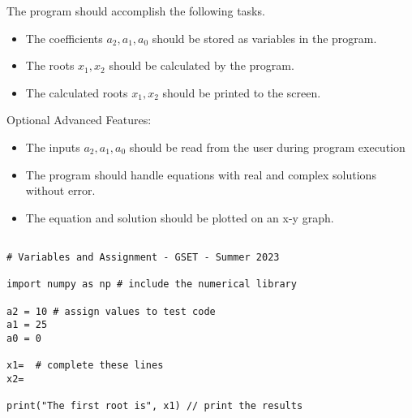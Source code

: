 \documentclass[12pt]{article}
\begin{document}
\begin{description}[labelindent=1cm]
\item[\textbf{\underline{Program Minimum Requirements:}}] \hfill \vspace{0mm}

The program should accomplish the following tasks. 


\begin{itemize}

	\item The coefficients $a_2,a_1,a_0$ should be stored as variables in the program.
	
	\item The roots $x_1, x_2$ should be calculated by the program.
	
	\item The calculated roots $x_1, x_2$ should be printed to the screen.

\end{itemize}	 
	Optional Advanced Features:
\begin{itemize}
	\item The inputs $a_2,a_1,a_0$ should be read from the user during program execution
		
	\item The program should handle equations with real and complex solutions without error. 
    
    \item The equation and solution should be plotted on an x-y graph.
    
\end{itemize}	
\newpage

\item[\textbf{\underline{Example Code:}}] \hfill \vspace{0mm}

	\begin{lstlisting}

# Variables and Assignment - GSET - Summer 2023 
	
import numpy as np # include the numerical library

a2 = 10 # assign values to test code
a1 = 25  
a0 = 0   

x1=  # complete these lines
x2=  

print("The first root is", x1) // print the results
	
	\end{lstlisting}
		


	\item[\textbf{\underline{Part 3 - Testing:}}] \hfill \vspace{0mm}
	\begin{enumerate}
	

\end{enumerate}
\end{description}
\end{document}
